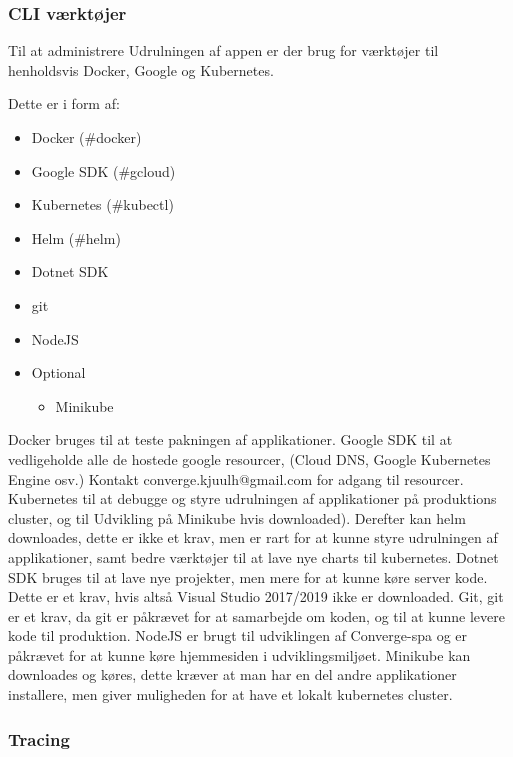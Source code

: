 \subsubsection{CLI værktøjer}

Til at administrere Udrulningen af appen er der brug for værktøjer til henholdsvis Docker, Google og Kubernetes.

Dette er i form af:

\begin{itemize}
    \item Docker (\#docker)
    \item Google SDK (\#gcloud)
    \item Kubernetes (\#kubectl)
    \item Helm (\#helm)
    \item Dotnet SDK
    \item git
    \item NodeJS
    \item Optional
    \begin{itemize}
        \item Minikube
    \end{itemize}
\end{itemize}

Docker bruges til at teste pakningen af applikationer. Google SDK til at vedligeholde alle de hostede google resourcer, (Cloud DNS, Google Kubernetes Engine osv.) Kontakt converge.kjuulh@gmail.com for adgang til resourcer. Kubernetes til at debugge og styre udrulningen af applikationer på produktions cluster, og til Udvikling på Minikube hvis downloaded). Derefter kan helm downloades, dette er ikke et krav, men er rart for at kunne styre udrulningen af applikationer, samt bedre værktøjer til at lave nye charts til kubernetes. Dotnet SDK bruges til at lave nye projekter, men mere for at kunne køre server kode. Dette er et krav, hvis altså Visual Studio 2017/2019 ikke er downloaded. Git, git er et krav, da git er påkrævet for at samarbejde om koden, og til at kunne levere kode til produktion. NodeJS er brugt til udviklingen af Converge-spa og er påkrævet for at kunne køre hjemmesiden i udviklingsmiljøet. Minikube kan downloades og køres, dette kræver at man har en del andre applikationer installere, men giver muligheden for at have et lokalt kubernetes cluster.

\subsubsection{Tracing}

